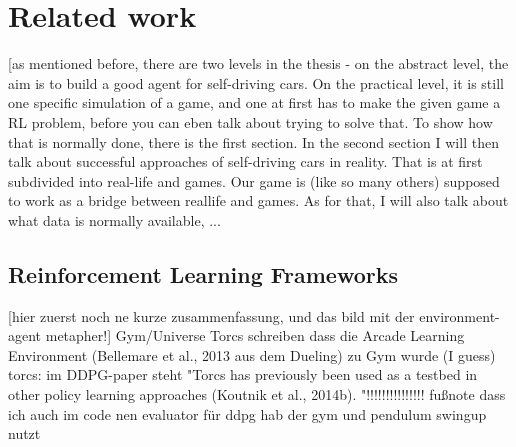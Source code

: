\chapter{Related work}

\label{ch:relatedwork}


[as mentioned before, there are two levels in the thesis - on the abstract level, the aim is to build a good agent for self-driving cars. On the practical level, it is still one specific simulation of a game, and one at first has to make the given game a RL problem, before you can eben talk about trying to solve that. To show how that is normally done, there is the first section. In the second section I will then talk about successful approaches of self-driving cars in reality. That is at first subdivided into real-life and games. Our game is (like so many others) supposed to work as a bridge between reallife and games. As for that, I will also talk about what data is normally available, ...

\section{Reinforcement Learning Frameworks} \label{ch:rlframeworks}

[hier zuerst noch ne kurze zusammenfassung, und das bild mit der environment-agent metapher!]
Gym/Universe
Torcs
schreiben dass die Arcade Learning Environment (Bellemare et al., 2013 aus dem Dueling) zu Gym wurde (I guess)
torcs: im DDPG-paper steht "Torcs has previously been used as a testbed in other
policy learning approaches (Koutnik et al., 2014b). "!!!!!!!!!!!!!!!
fußnote dass ich auch im code nen evaluator für ddpg hab der gym und pendulum swingup nutzt\\


